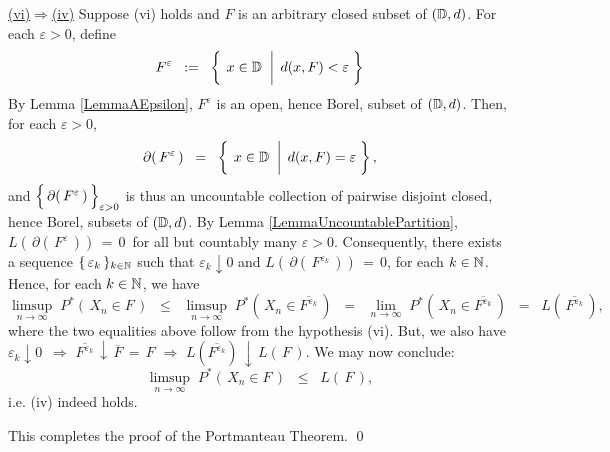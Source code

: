 \vskip 0.5cm \noindent
\underline{(vi)\;$\Longrightarrow$\;(iv)}
\vskip 0.2cm \noindent
Suppose (vi) holds and $F$ is an arbitrary closed subset of $(\mathbb{D},d)$.
For each $\varepsilon > 0$, define
\begin{equation*}
F^{\varepsilon}
\;\; := \;\;
	\left\{\;
	\left.
	x \overset{{\color{white}+}}{\in} \D
	\;\;\right\vert\;
	d(x,F) < \varepsilon
	\;\right\} 
\end{equation*}
By Lemma \ref{LemmaAEpsilon}, $F^{\varepsilon}$ is an open, hence Borel, subset of $(\mathbb{D},d)$.
Then, for each $\varepsilon > 0$,
\begin{equation*}
\partial\!\left(\,F^{\varepsilon}\,\right)
\;\; = \;\;
	\left\{\;
	\left.
	x \overset{{\color{white}+}}{\in} \D
	\;\;\right\vert\;
	d(x,F) = \varepsilon
	\;\right\},
\end{equation*}
and 
$\left\{\,\overset{{\color{white}.}}{\partial}\!\left(\,F^{\varepsilon}\,\right)\,\right\}_{\varepsilon > 0}$
is thus an uncountable collection of pairwise disjoint closed, hence Borel, subsets of $(\mathbb{D},d)$.
By Lemma \ref{LemmaUncountablePartition},
\,$L\!\left(\,\partial\!\left(\,F^{\varepsilon}\,\right)\right) \,=\, 0$\,
for all but countably many $\varepsilon > 0$.
Consequently, there exists a sequence $\{\,\varepsilon_{k}\,\}_{k \in \mathbb{N}}$
such that $\varepsilon_{k} \downarrow 0$ and
$L\!\left(\,\partial\!\left(\,F^{\varepsilon_{k}}\,\right)\right) \,=\, 0$, for each $k \in \mathbb{N}$.
Hence, for each $k \in \mathbb{N}$, we have
\begin{equation*}
\underset{n\rightarrow\infty}{\limsup}\;P^{*}\!\left(\,X_{n} \in F\,\right)
\;\;\leq\;\;
	\underset{n\rightarrow\infty}{\limsup}\;P^{*}\!\left(\,X_{n} \in \overline{F^{\varepsilon_{k}}}\,\right)
\;\;=\;\;
	\underset{n\rightarrow\infty}{\lim}\;P^{*}\!\left(\,X_{n} \in \overline{F^{\varepsilon_{k}}}\,\right)
\;\;=\;\;
	L\!\left(\,\overline{F^{\varepsilon_{k}}}\,\right),
\end{equation*}
where the two equalities above follow from the hypothesis (vi).
But, we also have $\varepsilon_{k} \downarrow 0$ \,\;$\Longrightarrow$\;
$\overline{F^{\varepsilon_{k}}} \,\downarrow\, \overline{F} \,=\, F$
\;$\Longrightarrow$\;
$L\!\left(\overline{F^{\varepsilon_{k}}}\right) \,\downarrow\, L\!\left(\,F\,\right)$.
We may now conclude:
\begin{equation*}
\underset{n\rightarrow\infty}{\limsup}\;P^{*}\!\left(\,X_{n} \in F\,\right)
\;\;\leq\;\;
	L\!\left(\,F\,\right),
\end{equation*}
i.e. (iv) indeed holds.

\vskip 0.5cm
\noindent
This completes the proof of the Portmanteau Theorem.
\qed



\renewcommand{\theenumi}{\roman{enumi}}
\renewcommand{\labelenumi}{\textnormal{(\theenumi)}$\;\;$}

